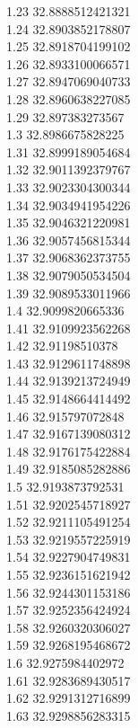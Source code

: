 {1.23	32.8888512421321\\
1.24	32.8903852178807\\
1.25	32.8918704199102\\
1.26	32.8933100066571\\
1.27	32.8947069040733\\
1.28	32.8960638227085\\
1.29	32.897383273567\\
1.3	32.8986675828225\\
1.31	32.8999189054684\\
1.32	32.9011392379767\\
1.33	32.9023304300344\\
1.34	32.9034941954226\\
1.35	32.9046321220981\\
1.36	32.9057456815344\\
1.37	32.9068362373755\\
1.38	32.9079050534504\\
1.39	32.9089533011966\\
1.4	32.9099820665336\\
1.41	32.9109923562268\\
1.42	32.91198510378\\
1.43	32.9129611748898\\
1.44	32.9139213724949\\
1.45	32.9148664414492\\
1.46	32.915797072848\\
1.47	32.9167139080312\\
1.48	32.9176175422884\\
1.49	32.9185085282886\\
1.5	32.9193873792531\\
1.51	32.9202545718927\\
1.52	32.9211105491254\\
1.53	32.9219557225919\\
1.54	32.9227904749831\\
1.55	32.9236151621942\\
1.56	32.9244301153186\\
1.57	32.9252356424924\\
1.58	32.9260320306027\\
1.59	32.9268195468672\\
1.6	32.9275984402972\\
1.61	32.9283689430517\\
1.62	32.9291312716899\\
1.63	32.9298856283315\\
}
